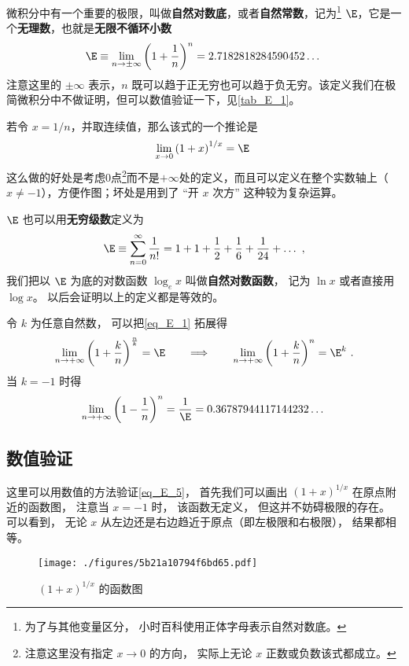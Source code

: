 
微积分中有一个重要的极限，叫做\textbf{自然对数底}，或者\textbf{自然常数}，记为\footnote{为了与其他变量区分， 小时百科使用正体字母表示自然对数底。} $\E$，它是一个\textbf{无理数}，也就是\textbf{无限不循环小数}
\begin{equation}\label{eq_E_1}
\E \equiv \lim_{n \to \pm\infty} \left(1 + \frac{1}{n}\right)^n = 2.7182818284590452\dots~
\end{equation}
注意这里的 $\pm\infty$ 表示，$n$ 既可以趋于正无穷也可以趋于负无穷。该定义我们在极简微积分中不做证明，但可以数值验证一下，见\autoref{tab_E_1}。

若令 $x = 1/n$，并取连续值，那么该式的一个推论是
\begin{equation}\label{eq_E_5}
\lim_{x \to 0} \left(1 + x\right)^{1/x} = \E~
\end{equation}
这么做的好处是考虑$0$点\footnote{注意这里没有指定 $x\to 0$ 的方向， 实际上无论 $x$ 正数或负数该式都成立。}而不是$+\infty$处的定义，而且可以定义在整个实数轴上（$x \neq -1$），方便作图；坏处是用到了 “开 $x$ 次方” 这种较为复杂运算。

$\E$ 也可以用\textbf{无穷级数}定义为
\begin{equation}\label{eq_E_2}
\E \equiv \sum_{n=0}^\infty \frac{1}{n!} = 1 + 1 + \frac{1}{2} + \frac{1}{6} + \frac{1}{24} +\dots~,
\end{equation}
我们把以 $\E$ 为底的对数函数 $\log_e x$ 叫做\textbf{自然对数函数}， 记为 $\ln x$ 或者直接用 $\log x$。 以后会证明以上的定义都是等效的。 %

令 $k$ 为任意自然数， 可以把\autoref{eq_E_1} 拓展得
\begin{equation}\label{eq_E_4}
\lim_{n \to +\infty} \left(1 + \frac{k}{n}\right)^{\frac{n}{k}} = \E
\qquad \Longrightarrow\qquad
\lim_{n \to +\infty} \left(1 + \frac{k}{n}\right)^n = \E^k~.
\end{equation}
当 $k = -1$ 时得
\begin{equation}\label{eq_E_3}
\lim_{n \to +\infty} \left(1 - \frac{1}{n}\right)^n = \frac{1}{\E} = 0.36787944117144232\dots~
\end{equation}

\subsection{数值验证}
这里可以用数值的方法验证\autoref{eq_E_5}， 首先我们可以画出 $(1+x)^{1/x}$ 在原点附近的函数图， 注意当 $x = -1$ 时， 该函数无定义， 但这并不妨碍极限的存在。 可以看到， 无论 $x$ 从左边还是右边趋近于原点（即左极限和右极限）， 结果都相等。
\begin{figure}[ht]
\centering
\texttt{[image: ./figures/5b21a10794f6bd65.pdf]}
\caption{$(1+x)^{1/x}$ 的函数图} \label{fig_E_1}
\end{figure}

